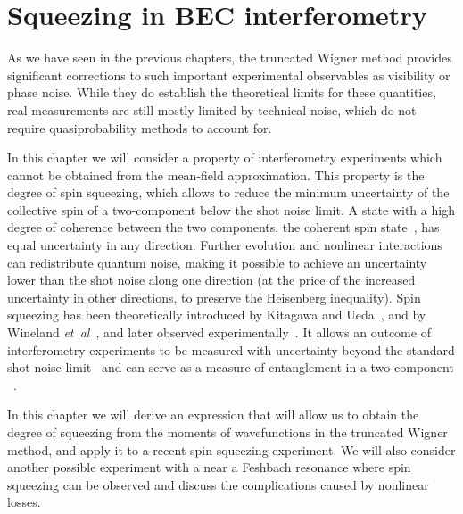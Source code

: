 \chapter{Squeezing in BEC interferometry}
\label{cha:bec-squeezing}

As we have seen in the previous chapters, the truncated Wigner method provides significant corrections to such important experimental observables as visibility or phase noise.
While they do establish the theoretical limits for these quantities, real measurements are still mostly limited by technical noise, which do not require quasiprobability methods to account for.

In this chapter we will consider a property of  interferometry experiments which cannot be obtained from the mean-field approximation.
This property is the degree of spin squeezing, which allows to reduce the minimum uncertainty of the collective spin of a two-component  below the shot noise limit.
A state with a high degree of coherence between the two components, the coherent spin state~\cite{Kitagawa1993}, has equal uncertainty in any direction.
Further evolution and nonlinear interactions can redistribute quantum noise, making it possible to achieve an uncertainty lower than the shot noise along one direction (at the price of the increased uncertainty in other directions, to preserve the Heisenberg inequality).
Spin squeezing has been theoretically introduced by Kitagawa and Ueda~\cite{Kitagawa1993}, and by Wineland \textit{et~al}~\cite{Wineland1994}, and later observed experimentally~\cite{Hald1999,Kuzmich2000}.
It allows an outcome of interferometry experiments to be measured with uncertainty beyond the standard shot noise limit~\cite{Riedel2010,Gross2010} and can serve as a measure of entanglement in a two-component ~\cite{Sorensen2001,He2012a}.

In this chapter we will derive an expression that will allow us to obtain the degree of squeezing from the moments of wavefunctions in the truncated Wigner method, and apply it to a recent spin squeezing experiment.
We will also consider another possible experiment with a  near a Feshbach resonance where spin squeezing can be observed and discuss the complications caused by nonlinear losses.






